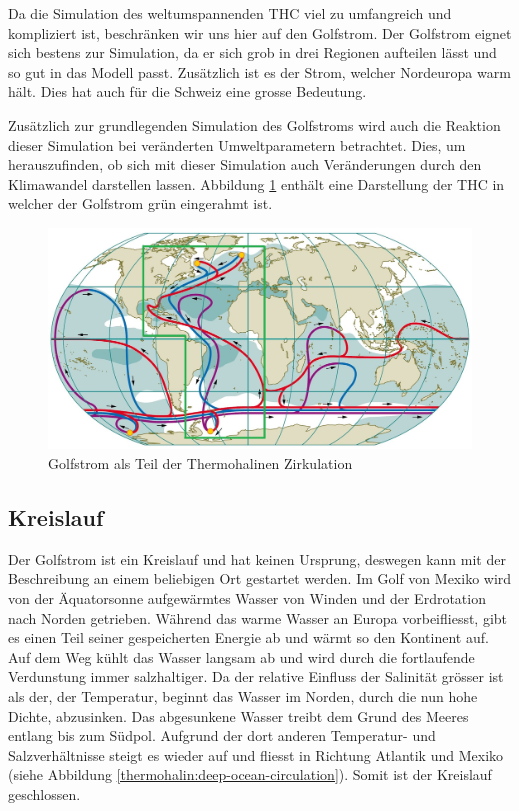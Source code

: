 Da die Simulation des weltumspannenden THC viel zu umfangreich und kompliziert ist, beschränken wir uns hier auf den Golfstrom.
Der Golfstrom eignet sich bestens zur Simulation, da er sich grob in drei Regionen aufteilen lässt und so gut in das Modell passt. Zusätzlich ist es der Strom, welcher Nordeuropa warm hält. Dies hat auch für die Schweiz eine grosse Bedeutung.

Zusätzlich zur grundlegenden Simulation des Golfstroms wird auch die Reaktion dieser Simulation bei veränderten Umweltparametern betrachtet. Dies, um herauszufinden, ob sich mit dieser Simulation auch Veränderungen durch den Klimawandel darstellen lassen. Abbildung \ref{thermohalin:Deep-Ocean-Currents} enthält eine Darstellung der THC in welcher der Golfstrom grün eingerahmt ist. 

\begin{figure}
	\includegraphics[width=12cm]{thermohalin/Bilder/Deep-Ocean-Currents2.jpg}
	\centering
	\caption{Golfstrom als Teil der Thermohalinen Zirkulation\label{thermohalin:Deep-Ocean-Currents}}
\end{figure}



\subsection{Kreislauf}

Der Golfstrom ist ein Kreislauf und hat keinen Ursprung, deswegen kann mit der Beschreibung an einem beliebigen Ort gestartet werden. Im Golf von Mexiko wird von der Äquatorsonne aufgewärmtes Wasser von Winden und der Erdrotation nach Norden getrieben. Während das warme Wasser an Europa vorbeifliesst, gibt es einen Teil seiner gespeicherten Energie ab und wärmt so den Kontinent auf.
Auf dem Weg kühlt das Wasser langsam ab und wird durch die fortlaufende Verdunstung immer salzhaltiger. Da der relative Einfluss der Salinität grösser ist als der, der Temperatur, beginnt das Wasser im Norden, durch die nun hohe Dichte, abzusinken. Das abgesunkene Wasser treibt dem Grund des Meeres entlang bis zum Südpol. Aufgrund der dort anderen Temperatur- und Salzverhältnisse steigt es wieder auf und fliesst in Richtung Atlantik und Mexiko (siehe Abbildung \ref{thermohalin:deep-ocean-circulation}). Somit ist der Kreislauf geschlossen.

